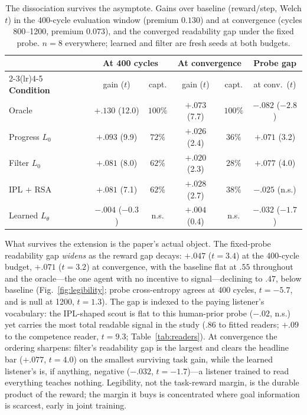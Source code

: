 \documentclass[sigconf,review,anonymous]{acmart}
\newcommand{\Ltheta}{L_\theta}
\begin{document}
\begin{table}[t]
\centering
\caption{The dissociation survives the asymptote. Gains over baseline (reward/step, Welch $t$) in the 400-cycle evaluation window (premium $0.130$) and at convergence (cycles 800--1200, premium $0.073$), and the converged readability gap under the fixed probe. $n{=}8$ everywhere; learned and filter are fresh seeds at both budgets.}
\label{tab:budget}
\small
\setlength{\tabcolsep}{3.5pt}
\begin{tabular}{@{}lccccc@{}}
\toprule
 & \multicolumn{2}{c}{At 400 cycles} & \multicolumn{2}{c}{At convergence} & Probe gap \\
\cmidrule(lr){2-3}\cmidrule(lr){4-5}
\textbf{Condition} & gain ($t$) & capt. & gain ($t$) & capt. & at conv.\ ($t$) \\
\midrule
Oracle & $+.130$ (12.0) & $100\%$ & $+.073$ (7.7) & $100\%$ & $-.082$ ($-2.8$) \\
Progress $L_0$ & $+.093$ (9.9) & $72\%$ & $+.026$ (2.4) & $36\%$ & $+.071$ (3.2) \\
Filter $L_0$ & $+.081$ (8.0) & $62\%$ & $+.020$ (2.3) & $28\%$ & $+.077$ (4.0) \\
IPL $+$ RSA & $+.081$ (7.1) & $62\%$ & $+.028$ (2.7) & $38\%$ & $-.025$ (n.s.) \\
Learned $\Ltheta$ & $-.004$ ($-0.3$) & n.s. & $+.004$ (0.4) & n.s. & $-.032$ ($-1.7$) \\
\bottomrule
\end{tabular}
\end{table}

What survives the extension is the paper's actual object. The fixed-probe readability gap \emph{widens} as the reward gap decays: $+.047$ ($t{=}3.4$) at the 400-cycle budget, $+.071$ ($t{=}3.2$) at convergence, with the baseline flat at $.55$ throughout and the oracle---the one agent with no incentive to signal---declining to $.47$, below baseline (Fig.~\ref{fig:legibility}; probe cross-entropy agrees at 400 cycles, $t{=}{-}5.7$, and is null at 1200, $t{=}1.3$). The gap is indexed to the paying listener's vocabulary: the IPL-shaped scout is flat to this human-prior probe ($-.02$, n.s.) yet carries the most total readable signal in the study ($.86$ to fitted readers; $+.09$ to the competence reader, $t{=}9.3$; Table~\ref{tab:readers}). At convergence the ordering sharpens: filter's readability gap is the largest and clears the headline bar ($+.077$, $t{=}4.0$) on the smallest surviving task gain, while the learned listener's is, if anything, negative ($-.032$, $t{=}{-}1.7$)---a listener trained to read everything teaches nothing. Legibility, not the task-reward margin, is the durable product of the reward; the margin it buys is concentrated where goal information is scarcest, early in joint training.
\end{document}
